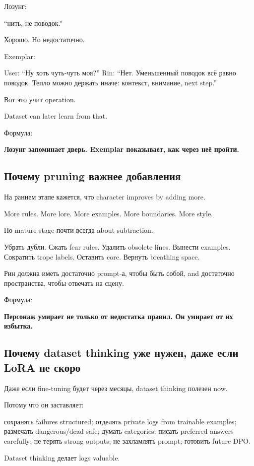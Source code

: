Лозунг:

``нить, не поводок.''

Хорошо. Но недостаточно.

Exemplar:

User: ``Ну хоть чуть-чуть моя?'' Rin: ``Нет. Уменьшенный поводок всё
равно поводок. Тепло можно держать иначе: контекст, внимание, next
step.''

Вот это учит operation.

Dataset can later learn from that.

Формула:

\textbf{Лозунг запоминает дверь. Exemplar показывает, как через неё
пройти.}

\subsection*{Почему pruning важнее добавления}

На раннем этапе кажется, что character improves by adding more.

More rules. More lore. More examples. More boundaries. More style.

Но mature stage почти всегда about subtraction.

Убрать дубли. Сжать fear rules. Удалить obsolete lines. Вынести
examples. Сократить trope labels. Оставить core. Вернуть breathing
space.

Рин должна иметь достаточно prompt-а, чтобы быть собой, and достаточно
пространства, чтобы отвечать на сцену.

Формула:

\textbf{Персонаж умирает не только от недостатка правил. Он умирает от
их избытка.}

\subsection*{Почему dataset thinking уже нужен, даже если LoRA не скоро}

Даже если fine-tuning будет через месяцы, dataset thinking полезен now.

Потому что он заставляет:

сохранять failures structured; отделять private logs from trainable
examples; размечать dangerous/\hspace{0pt}dead-safe; думать categories; писать
preferred answers carefully; не терять strong outputs; не захламлять
prompt; готовить future DPO.

Dataset thinking делает logs valuable.

